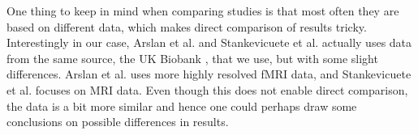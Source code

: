 One thing to keep in mind when comparing studies is that most often they are based on different data, which makes direct comparison of results tricky. Interestingly in our case, Arslan et al. and Stankevicuete et al. actually uses data from the same source, the UK Biobank \cite{ukbiobank},  that we use, but with some slight differences. Arslan et al. uses more highly resolved fMRI data, and Stankevicuete et al. focuses on MRI data. Even though this does not enable direct comparison, the data is a bit more similar and hence one could perhaps draw some conclusions on possible differences in results. 

